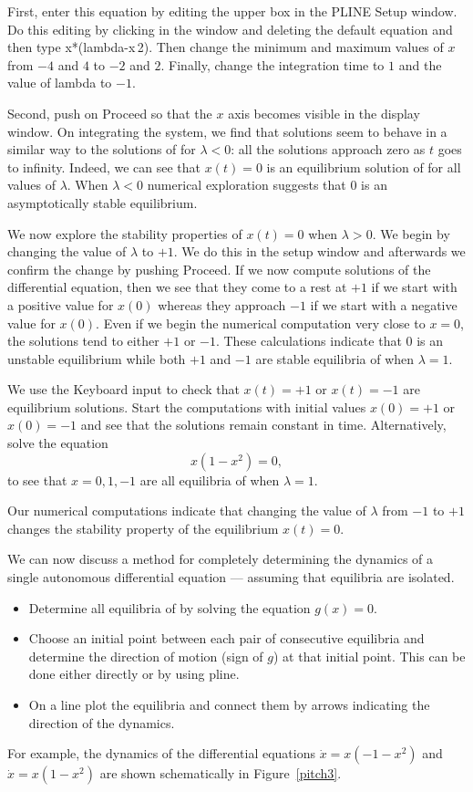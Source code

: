 First, enter this equation by editing the upper box in the 
{\sf PLINE Setup} window.  Do this editing by clicking in 
the window and deleting the default equation and then type 
{\sf x*(lambda-x\^{$\,\!$}2)}.  Then change the minimum 
and maximum values of $x$ from $-4$ and $4$ to $-2$ and $2$.  
Finally, change the integration time to $1$ and the value
of {\sf lambda} to $-1$.  

Second,  push on {\sf Proceed} so that the $x$ axis becomes 
visible in the display window.
On integrating the system, we find that solutions seem
to behave in a similar way to the solutions of  for
$\lambda < 0$: all the solutions approach zero as $t$ goes to
infinity.  Indeed, we can see that $x(t)=0$ is an equilibrium
solution of  for all values of $\lambda$.  When
$\lambda<0$ numerical exploration suggests that $0$ is an
asymptotically stable equilibrium.

We now explore the stability properties of $x(t)=0$ when
$\lambda >0$.  We begin by changing the value of $\lambda$ to
$+1$.  We do this in the setup window and afterwards we confirm
the change by pushing {\sf Proceed}.  If we now compute
solutions of the differential equation, then we see that they
come to a rest at $+1$ if we start with a positive value for
$x(0)$ whereas they approach $-1$ if we start with a negative
value for $x(0)$.  Even if we begin the numerical computation
very close to $x=0$, the solutions tend to either $+1$ or $-1$.
These calculations indicate that $0$ is an unstable equilibrium
while both $+1$ and $-1$ are stable equilibria of 
when $\lambda =1$.

We use the {\sf Keyboard input} to check that $x(t) = +1$ or
$x(t) = -1$ are equilibrium solutions.  Start the computations
with initial values $x(0) = +1$ or $x(0) = -1$ and see that the
solutions remain constant in time.  Alternatively, solve the
equation
\[
x(1-x^2) = 0,
\]
to see that $x=0,1,-1$ are all equilibria of  when
$\lambda=1$.

Our numerical computations indicate that changing the
value of $\lambda$ from $-1$ to $+1$ changes the stability
property of the equilibrium $x(t)=0$.

We can now discuss a method for completely determining the
dynamics of a single autonomous differential equation 
--- assuming that equilibria are isolated.

\begin{itemize}
\item Determine all equilibria of  by solving the
equation $g(x)=0$.
\item Choose an initial point between each pair of consecutive
equilibria and determine the direction of motion (sign of $g$) at
that initial point. This can be done either directly or by using
{\sf pline}.
\item On a line plot the equilibria  and
connect them by arrows indicating the direction of the dynamics.
\end{itemize}
For example, the dynamics of the differential equations $\dot{x}
= x(-1-x^2)$ and $\dot{x} = x(1-x^2)$ are shown schematically in
Figure~\ref{pitch3}.

